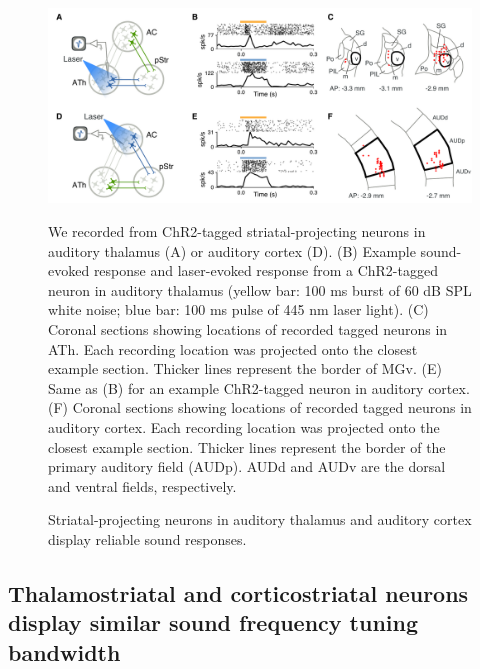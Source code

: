 \begin{figure}[hp]
  \begin{center}
    \includegraphics[width=6in]{figures/chapter3/fig3_noise_laser}%
  \end{center}
\caption{Striatal-projecting neurons in auditory thalamus and auditory cortex display reliable sound responses. 
}{We recorded from ChR2-tagged striatal-projecting neurons in auditory thalamus (A) or auditory cortex (D).
%
(B) Example sound-evoked response and laser-evoked response from a ChR2-tagged neuron in auditory thalamus (yellow bar: 100 ms burst of 60 dB SPL white noise; blue bar: 100 ms pulse of 445 nm laser light). 
%
(C) Coronal sections showing locations of recorded tagged neurons in ATh. Each recording location was projected onto the closest example section. Thicker lines represent the border of MGv.
%
(E) Same as (B) for an example ChR2-tagged neuron in auditory cortex. 
%
(F) Coronal sections showing locations of recorded tagged neurons in auditory cortex. Each recording location was projected onto the closest example section. Thicker lines represent the border of the primary auditory field (AUDp). AUDd and AUDv are the dorsal and ventral fields, respectively. 
}
\end{figure}

\subsection{Thalamostriatal and corticostriatal neurons display similar sound frequency tuning bandwidth}


